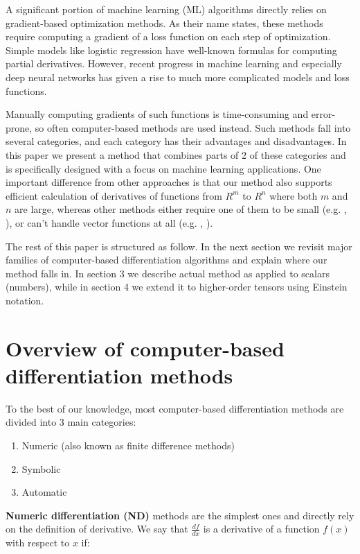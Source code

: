 \documentclass[conference]{IEEEtran}
\begin{document}
A significant portion of machine learning (ML) algorithms directly
relies on gradient-based optimization methods. As their name states,
these methods require computing a gradient of a loss function on each
step of optimization. Simple models like logistic regression have
well-known formulas for computing partial derivatives. However, recent
progress in machine learning and especially deep neural networks has
given a rise to much more complicated models and loss functions.

Manually computing gradients of such functions is time-consuming and
error-prone, so often computer-based methods are used instead. Such
methods fall into several categories, and each category has their
advantages and disadvantages. In this paper we present a method that
combines parts of 2 of these categories and is specifically designed
with a focus on machine learning applications. One important
difference from other approaches is that our method also supports
efficient calculation of derivatives of functions from $R^m$ to $R^n$
where both $m$ and $n$ are large, whereas other methods either require
one of them to be small (e.g. \cite{ForwardDiff}, \cite{Stan}), or
can't handle vector functions at all (e.g. \cite{Mathematica},
\cite{SymPy}).

The rest of this paper is structured as follow. In the next section we
revisit major families of computer-based differentiation algorithms
and explain where our method falls in. In section 3 we describe actual
method as applied to scalars (numbers), while in section 4 we extend
it to higher-order tensors using Einstein notation.


\section{Overview of computer-based differentiation methods}

To the best of our knowledge, most computer-based differentiation
methods are divided into 3 main categories:

\begin{enumerate}
\item Numeric (also known as finite difference methods)
\item Symbolic
\item Automatic
\end{enumerate}


\textbf{Numeric differentiation (ND)} methods are the simplest ones
and directly rely on the definition of derivative. We say that
$\frac{df}{dx}$ is a derivative of a function $f(x)$ with respect to
$x$ if:
\end{document}
